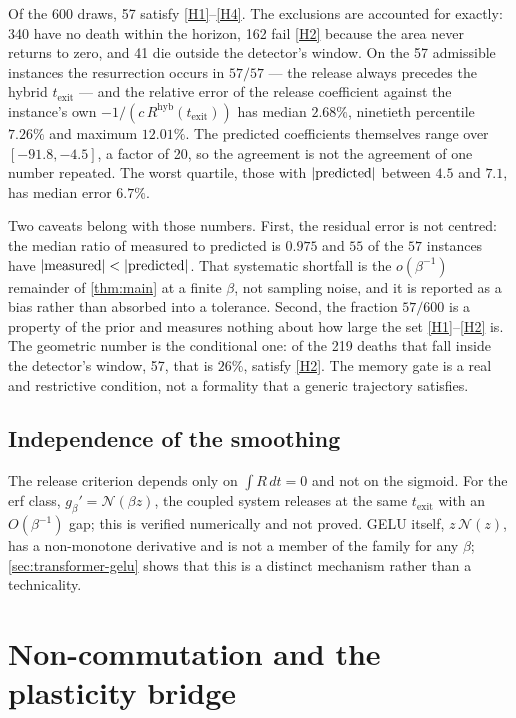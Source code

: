 \documentclass[11pt]{article}
\theoremstyle{definition}
\theoremstyle{remark}
\newcommand{\texit}{t_{\mathrm{exit}}}
\newcommand{\hyb}{\mathrm{hyb}}
\begin{document}
Of the 600 draws, 57 satisfy \eqref{H1}--\eqref{H4}. The exclusions are
accounted for exactly: 340 have no death within the horizon, 162 fail
\eqref{H2} because the area never returns to zero, and 41 die outside the
detector's window. On the 57 admissible instances the resurrection occurs in
$57/57$ --- the release always precedes the hybrid $\texit$ --- and the relative
error of the release coefficient against the instance's own
$-1/(c\,R^{\hyb}(\texit))$ has median $2.68\%$, ninetieth percentile $7.26\%$
and maximum $12.01\%$. The predicted coefficients themselves range over
$[-91.8,-4.5]$, a factor of 20, so the agreement is not the agreement of one
number repeated. The worst quartile, those with $|{\rm predicted}|$ between
$4.5$ and $7.1$, has median error $6.7\%$.

Two caveats belong with those numbers. First, the residual error is not
centred: the median ratio of measured to predicted is $0.975$ and $55$ of the
$57$ instances have $|{\rm measured}|<|{\rm predicted}|$. That systematic
shortfall is the $o(\beta^{-1})$ remainder of \cref{thm:main} at a finite
$\beta$, not sampling noise, and it is reported as a bias rather than absorbed
into a tolerance. Second, the fraction $57/600$ is a property of the prior and
measures nothing about how large the set \eqref{H1}--\eqref{H2} is. The
geometric number is the conditional one: of the 219 deaths that fall inside the
detector's window, 57, that is $26\%$, satisfy \eqref{H2}. The memory gate is a
real and restrictive condition, not a formality that a generic trajectory
satisfies.

\subsection{Independence of the smoothing}\label{sec:regularization}

The release criterion depends only on $\int R\,dt=0$ and not on the sigmoid. For
the erf class, $g_\beta'=\mathcal N(\beta z)$, the coupled system releases at the
same $\texit$ with an $O(\beta^{-1})$ gap; this is verified numerically and not
proved. GELU itself, $z\,\mathcal N(z)$, has a non-monotone derivative and is not
a member of the family for any $\beta$; \cref{sec:transformer-gelu} shows that
this is a distinct mechanism rather than a technicality.

\section{Non-commutation and the plasticity bridge}\label{sec:noncomm}
\end{document}
